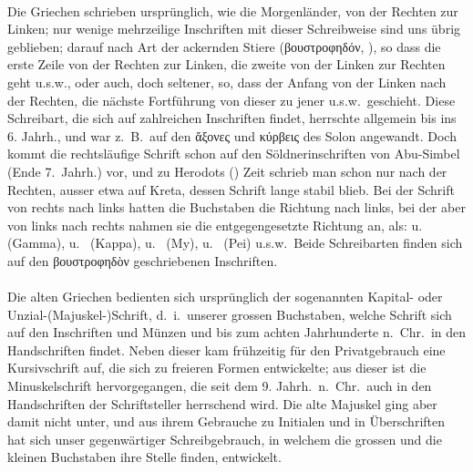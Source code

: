 \paragraph{} Die Griechen schrieben ursprünglich, wie die Morgenländer, von der
Rechten zur Linken; nur wenige mehrzeilige Inschriften mit dieser Schreibweise
sind uns übrig geblieben; darauf nach Art der ackernden Stiere (βουστροφηδόν,
), so dass die erste Zeile von der Rechten zur Linken, die
zweite von der Linken zur Rechten geht u.s.w., oder auch, doch seltener, so,
dass der Anfang von der Linken nach der Rechten, die nächste Fortführung von
dieser zu jener u.s.w.~geschieht.
Diese Schreibart, die sich auf zahlreichen Inschriften findet, herrschte
allgemein bis ins 6. Jahrh., und war z.~B.\ auf den ἄξονες und κύρβεις des Solon
angewandt.
Doch kommt die rechtsläufige Schrift schon auf den Söldnerinschriften von
Abu-Simbel {(Ende 7.\ Jahrh.)} vor, und zu Herodots () Zeit
schrieb man schon nur nach der Rechten, ausser etwa auf Kreta, dessen Schrift
lange stabil blieb. Bei der Schrift von rechts nach links hatten die Buchstaben
die Richtung nach links, bei der aber von links nach rechts nahmen sie die
entgegengesetzte Richtung an, als:  u.\  (Gamma),
 u.\  (Kappa),  u.\  (My),
 u.\  (Pei) u.s.w.~Beide Schreibarten finden sich
auf den βουστροφηδὸν geschriebenen Inschriften.

\paragraph{} Die alten Griechen bedienten sich ursprünglich der sogenannten
Kapital- oder Unzial-{(Majuskel-)}Schrift, d.~i.~unserer grossen Buchstaben,
welche Schrift sich auf den Inschriften und Münzen und bis zum achten
Jahrhunderte n.~Chr.~in den Handschriften findet.
Neben dieser kam frühzeitig für den Privatgebrauch eine Kursivschrift auf, die
sich zu freieren Formen entwickelte; aus dieser ist die Minuskelschrift
hervorgegangen, die seit dem 9. Jahrh.~n.~Chr.~auch in den Handschriften der
Schriftsteller herrschend wird.
Die alte Majuskel ging aber damit nicht unter, und aus ihrem Gebrauche zu
Initialen und in Überschriften hat sich unser gegenwärtiger Schreibgebrauch, in
welchem die grossen und die kleinen Buchstaben ihre Stelle finden, entwickelt.

\clearpage%

